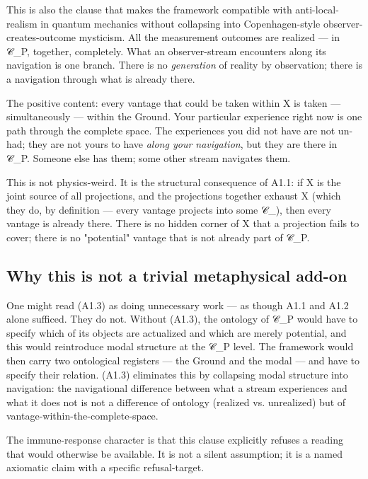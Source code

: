\documentclass[11pt, openany]{book}
\begin{document}
This is also the clause that makes the framework compatible with anti-local-realism in quantum mechanics without collapsing into Copenhagen-style observer-creates-outcome mysticism. All the measurement outcomes are realized --- in 𝒞\_\allowbreak{}P, together, completely. What an observer-stream encounters along its navigation is one branch. There is no \textit{generation} of reality by observation; there is a navigation through what is already there.

The positive content: every vantage that could be taken within X is taken --- simultaneously --- within the Ground. Your particular experience right now is one path through the complete space. The experiences you did not have are not un-had; they are not yours to have \textit{along your navigation}, but they are there in 𝒞\_\allowbreak{}P. Someone else has them; some other stream navigates them.

This is not physics-weird. It is the structural consequence of A1.1: if X is the joint source of all projections, and the projections together exhaust X (which they do, by definition --- every vantage projects into some 𝒞\_), then every vantage is already there. There is no hidden corner of X that a projection fails to cover; there is no "potential" vantage that is not already part of 𝒞\_\allowbreak{}P.

\subsection{Why this is not a trivial metaphysical add-on}

One might read (A1.3) as doing unnecessary work --- as though A1.1 and A1.2 alone sufficed. They do not. Without (A1.3), the ontology of 𝒞\_\allowbreak{}P would have to specify which of its objects are actualized and which are merely potential, and this would reintroduce modal structure at the 𝒞\_\allowbreak{}P level. The framework would then carry two ontological registers --- the Ground and the modal --- and have to specify their relation. (A1.3) eliminates this by collapsing modal structure into navigation: the navigational difference between what a stream experiences and what it does not is not a difference of ontology (realized vs. unrealized) but of vantage-within-the-complete-space.

The immune-response character is that this clause explicitly refuses a reading that would otherwise be available. It is not a silent assumption; it is a named axiomatic claim with a specific refusal-target.
\end{document}
